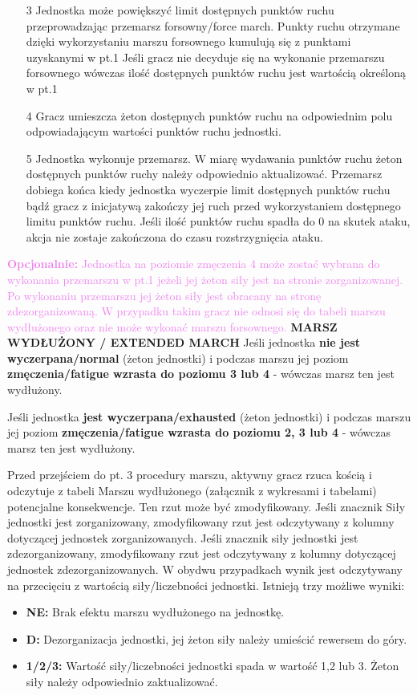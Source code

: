 \begin{itemize}
  \item[3] Jednostka może powiększyć limit dostępnych punktów ruchu przeprowadzając przemarsz forsowny/force march. Punkty ruchu otrzymane dzięki wykorzystaniu marszu forsownego kumulują się z punktami uzyskanymi w pt.1 Jeśli gracz nie decyduje się na wykonanie przemarszu forsownego wówczas ilość dostępnych punktów ruchu jest wartością określoną w pt.1
  \item[4] Gracz umieszcza żeton dostępnych punktów ruchu na odpowiednim polu odpowiadającym wartości punktów ruchu jednostki.
  \item[5] Jednostka wykonuje przemarsz. W miarę wydawania punktów ruchu żeton dostępnych punktów ruchy należy odpowiednio aktualizować. Przemarsz dobiega końca kiedy jednostka wyczerpie limit dostępnych punktów ruchu bądź gracz z inicjatywą zakończy jej ruch przed wykorzystaniem dostępnego limitu punktów ruchu. Jeśli ilość punktów ruchu spadła do 0 na skutek ataku, akcja nie zostaje zakończona do czasu rozstrzygnięcia ataku.
\end{itemize}
\textcolor{violet}{\textbf{Opcjonalnie: }Jednostka na poziomie zmęczenia 4 może zostać wybrana do wykonania przemarszu w pt.1 jeżeli jej żeton siły jest na stronie zorganizowanej. Po wykonaniu przemarszu jej żeton siły jest obracany na stronę zdezorganizowaną. W przypadku takim gracz nie odnosi się do tabeli marszu wydłużonego oraz nie może wykonać marszu forsownego.}
\bigbreak
\textbf{MARSZ WYDŁUŻONY / EXTENDED MARCH}
\bigbreak
Jeśli jednostka \textbf{nie jest wyczerpana/normal} (żeton jednostki) i podczas marszu jej poziom \textbf{zmęczenia/fatigue wzrasta do poziomu 3 lub 4} - wówczas marsz ten jest wydłużony.\par
Jeśli jednostka \textbf{jest wyczerpana/exhausted} (żeton jednostki) i podczas marszu jej poziom \textbf{zmęczenia/fatigue wzrasta do poziomu 2, 3 lub 4} - wówczas marsz ten jest wydłużony.\par
Przed przejściem do pt. 3 procedury marszu, aktywny gracz rzuca kością i odczytuje z tabeli Marszu wydłużonego (załącznik z wykresami i tabelami) potencjalne konsekwencje. Ten rzut może być zmodyfikowany. Jeśli znacznik Siły jednostki jest zorganizowany, zmodyfikowany rzut jest odczytywany z kolumny dotyczącej jednostek zorganizowanych. Jeśli znacznik siły jednostki jest zdezorganizowany, zmodyfikowany rzut jest odczytywany z kolumny dotyczącej jednostek zdezorganizowanych. W obydwu przypadkach wynik jest odczytywany na przecięciu z wartością siły/liczebności jednostki. Istnieją trzy możliwe wyniki:
\begin{itemize}
  \item \textbf{NE:} Brak efektu marszu wydłużonego na jednostkę.
  \item \textbf{D:} Dezorganizacja jednostki, jej żeton siły należy umieścić rewersem do góry.
  \item \textbf{1/2/3:} Wartość siły/liczebności jednostki spada w wartość 1,2 lub 3. Żeton siły należy odpowiednio zaktualizować.
\end{itemize}
